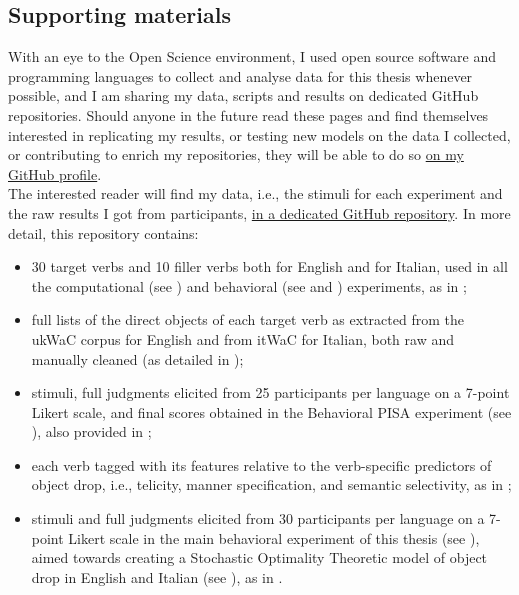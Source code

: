\subsection{Supporting materials} 
With an eye to the Open Science environment, I used open source software and programming languages to collect and analyse data for this thesis whenever possible, and I am sharing my data, scripts and results on dedicated GitHub repositories. Should anyone in the future read these pages and find themselves interested in replicating my results, or testing new models on the data I collected, or contributing to enrich my repositories, they will be able to do so \href{https://github.com/giuliacappelli}{on my GitHub profile}.\\ %
The interested reader will find my data, i.e., the stimuli for each experiment and the raw results I got from participants, \href{https://github.com/giuliacappelli/dissertationData}{in a dedicated GitHub repository}. In more detail, this repository contains:
\begin{itemize}
    \item 30 target verbs and 10 filler verbs both for English and for Italian, used in all the computational (see ) and behavioral (see  and ) experiments, as in ;
    \item full lists of the direct objects of each target verb as extracted from the ukWaC corpus for English and from itWaC for Italian, both raw and manually cleaned (as detailed in );
    \item stimuli, full judgments elicited from 25 participants per language on a 7-point Likert scale, and final scores obtained in the Behavioral PISA experiment (see ), also provided in ;
    \item each verb tagged with its features relative to the verb-specific predictors of object drop, i.e., telicity, manner specification, and semantic selectivity, as in ;
    \item stimuli and full judgments elicited from 30 participants per language on a 7-point Likert scale in the main behavioral experiment of this thesis (see ), aimed towards creating a Stochastic Optimality Theoretic model of object drop in English and Italian (see ), as in .
\end{itemize}
